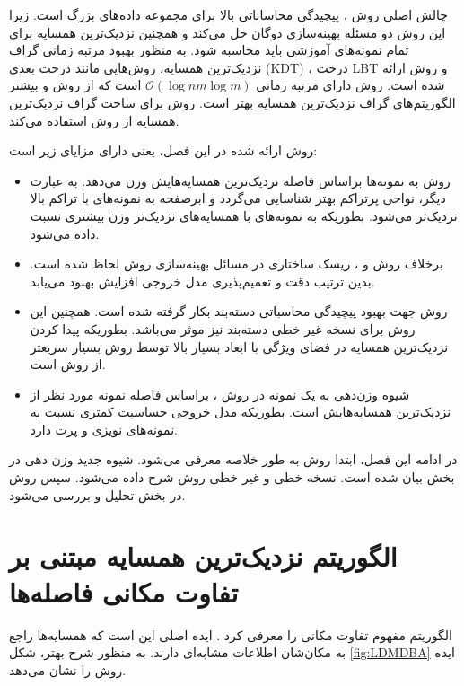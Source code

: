 چالش اصلی روش ، پیچیدگی محاساباتی بالا برای مجموعه داده‌های بزرگ است. زیرا این روش دو مسئله بهینه‌سازی دوگان حل می‌کند و همچنین  نزدیک‌ترین همسایه برای تمام نمونه‌های آموزشی باید محاسبه شود. به منظور بهبود مرتبه زمانی گراف نزدیک‌ترین همسایه، روش‌هایی مانند درخت  بعدی (\gls{KDT}) \cite{friedman1977}، درخت \gls{LBT} \cite{chen2007} و روش  ارائه شده است. روش  دارای مرتبه زمانی  $\mathcal{O}(\log nm\log m)$ است که از روش  و بیشتر الگوریتم‌های گراف نزدیک‌ترین همسایه بهتر است. روش  برای ساخت گراف نزدیک‌ترین همسایه از روش  استفاده می‌کند.

روش ارائه شده در این فصل، یعنی  دارای مزایای زیر است:  
\begin{itemize}[label=$\bullet$]
	\item	روش  به نمونه‌ها براساس فاصله نزدیک‌ترین همسایه‌هایش وزن می‌دهد. به عبارت دیگر، نواحی پرتراکم بهتر شناسایی می‌گردد و ابرصفحه به نمونه‌های با تراکم بالا نزدیک‌تر می‌شود. بطوریکه به نمونه‌های با همسایه‌های نزدیک‌تر وزن بیشتری نسبت داده می‌شود.
	\item برخلاف روش  و ، ریسک ساختاری در مسائل بهینه‌سازی روش  لحاظ شده است. بدین ترتیب دقت و تعمیم‌پذیری مدل خروجی افزایش بهبود می‌یابد.
	\item روش  جهت بهبود پیچیدگی محاسباتی دسته‌بند بکار گرفته شده است. همچنین این روش برای نسخه غیر خطی دسته‌بند  نیز موثر می‌باشد. بطوریکه پیدا کردن  نزدیک‌ترین همسایه در فضای ویژگی با ابعاد بسیار بالا توسط روش  بسیار سریعتر از روش  است.
	\item شیوه وزن‌دهی به یک نمونه در روش ، براساس فاصله نمونه مورد نظر از نزدیک‌ترین همسایه‌هایش است. بطوریکه مدل خروجی حساسیت کمتری نسبت به نمونه‌های نویزی و پرت دارد.
\end{itemize}

در ادامه این فصل، ابتدا روش  به طور خلاصه معرفی می‌شود. شیوه جدید وزن دهی در بخش بیان شده است. نسخه خطی و غیر خطی روش  شرح داده می‌شود. سپس روش  در بخش تحلیل و بررسی می‌شود.

\section{الگوریتم نزدیک‌ترین همسایه مبتنی بر تفاوت مکانی فاصله‌ها}\label{sec:4:2}
الگوریتم  مفهوم تفاوت مکانی را معرفی کرد \cite{xia2015}. ایده اصلی این است که همسایه‌ها راجع به مکان‌شان اطلاعات مشابه‌ای دارند. به منظور شرح بهتر، شکل \ref{fig:LDMDBA}  ایده روش  را نشان می‌دهد.

